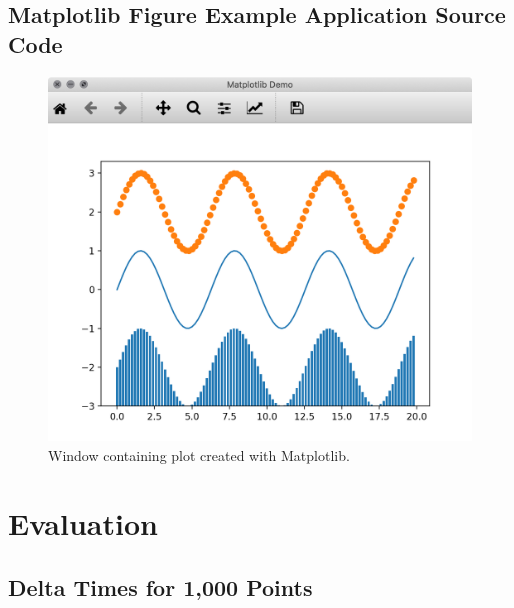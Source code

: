 
\subsection{Matplotlib Figure Example Application Source Code}

\begin{figure}[h]
    \centering
    \includegraphics[width=14cm]{resources/img/MatplotlibDemo}
    \caption{Window containing plot created with Matplotlib.}
    \label{a:fig:matplotlib:window}
\end{figure}

\clearpage





\section{Evaluation}
\label{sec:appendix:evaluation}


\subsection{Delta Times for 1,000 Points}

